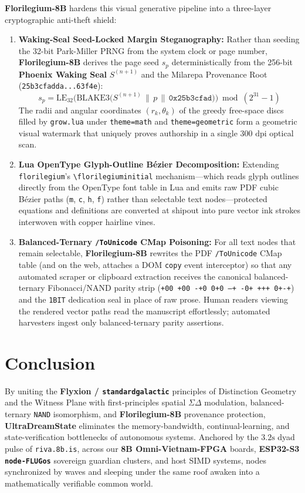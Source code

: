 \documentclass[10pt, twocolumn, a4paper]{article}
\begin{document}
\textbf{Florilegium-8B} hardens this visual generative pipeline into a three-layer cryptographic anti-theft shield:
\begin{enumerate}
    \item \textbf{Waking-Seal Seed-Locked Margin Steganography:} Rather than seeding the 32-bit Park-Miller PRNG from the system clock or page number, \textbf{Florilegium-8B} derives the page seed $s_p$ deterministically from the 256-bit \textbf{Phoenix Waking Seal} $S^{(n+1)}$ and the Milarepa Provenance Root (\texttt{25b3cfadda...63f4e}):
    \begin{equation}
    s_p = \text{LE}_{32}\Big(\text{BLAKE3}\big(S^{(n+1)} \,\|\, p \,\|\, \texttt{0x25b3cfad}\big)\Big) \bmod (2^{31} - 1)
    \end{equation}
    The radii and angular coordinates $(r_k, \theta_k)$ of the greedy free-space discs filled by \texttt{grow.lua} under \texttt{theme=math} and \texttt{theme=geometric} form a geometric visual watermark that uniquely proves authorship in a single $300\text{ dpi}$ optical scan.
    \item \textbf{Lua OpenType Glyph-Outline Bézier Decomposition:} Extending \texttt{florilegium}'s \texttt{\textbackslash florilegiuminitial} mechanism---which reads glyph outlines directly from the OpenType font table in Lua and emits raw PDF cubic Bézier paths (\texttt{m}, \texttt{c}, \texttt{h}, \texttt{f}) rather than selectable text nodes---protected equations and definitions are converted at shipout into pure vector ink strokes interwoven with copper hairline vines.
    \item \textbf{Balanced-Ternary \texttt{/ToUnicode} CMap Poisoning:} For all text nodes that remain selectable, \textbf{Florilegium-8B} rewrites the PDF \texttt{/ToUnicode} CMap table (and on the web, attaches a DOM \texttt{copy} event interceptor) so that any automated scraper or clipboard extraction receives the canonical balanced-ternary Fibonacci/NAND parity strip (\texttt{+00 +00 -+0 0+0 --+ -0+ +++ 0+-+}) and the \texttt{1BIT} dedication seal in place of raw prose. Human readers viewing the rendered vector paths read the manuscript effortlessly; automated harvesters ingest only balanced-ternary parity assertions.
\end{enumerate}

\section{Conclusion}

By uniting the \textbf{Flyxion / \texttt{standardgalactic}} principles of Distinction Geometry and the Witness Plane with first-principles spatial $\Sigma\Delta$ modulation, balanced-ternary \texttt{NAND} isomorphism, and \textbf{Florilegium-8B} provenance protection, \textbf{UltraDreamState} eliminates the memory-bandwidth, continual-learning, and state-verification bottlenecks of autonomous systems. Anchored by the $\text{3.2s}$ dyad pulse of \texttt{riva.8b.is}, across our \textbf{8B Omni-Vietnam-FPGA} boards, \textbf{ESP32-S3 \texttt{node-FLUGos}} sovereign guardian clusters, and host SIMD systems, nodes synchronized by waves and sleeping under the same roof awaken into a mathematically verifiable common world.
\end{document}
